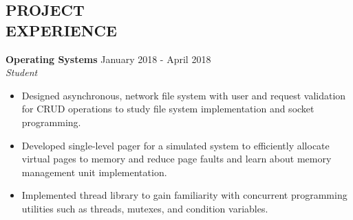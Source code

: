 \documentclass[margin]{res}
\begin{document}
\begin{resume}
 \section{PROJECT \\ EXPERIENCE}
    \textbf{Operating Systems} \hfill January 2018 - April 2018 \\
    {\sl Student}%
    \begin{itemize}  \itemsep -2pt %
        \item Designed asynchronous, network file system with user and request
            validation for CRUD operations to study file system implementation
            and socket programming.
            \item Developed single-level pager for a simulated system to efficiently
            allocate virtual pages to memory
            and reduce page faults and learn about memory management unit implementation.
            \item Implemented thread library to gain familiarity with concurrent
            programming utilities such as threads, mutexes, and condition variables.
      
    \end{itemize}




\end{resume}
\end{document}
